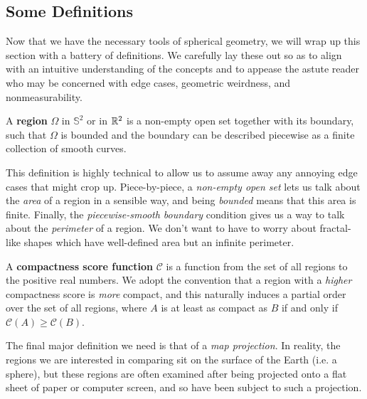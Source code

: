 \subsection{Some Definitions}

Now that we have the necessary tools of spherical geometry, we will wrap up this section with a battery of definitions. 
We carefully lay these out so
as to align with an intuitive understanding of the concepts and to
appease the astute reader who may be concerned with edge cases,
geometric weirdness, and nonmeasurability. 









\begin{definition}
	A \textbf{region} $\Omega$ in $\mathbb{S}^2$ or 
	in $\mathbb{R}^2$ is a non-empty open set together with its
	boundary, such that $\Omega$ is bounded and the boundary can be described piecewise as 
	a finite collection of smooth curves.
\end{definition}

This definition is highly technical to allow us to assume away any annoying edge 
cases that might crop up.  Piece-by-piece, a \textit{non-empty open set} lets us 
talk about the \textit{area} of a region in a sensible way, and being \textit{bounded} means that this area is finite.  Finally, the 
\textit{piecewise-smooth boundary} condition gives us a way to talk about the \textit{perimeter} 
of a region.  We don't want to have to worry about fractal-like shapes which have well-defined 
area but an infinite perimeter.










\begin{definition}
  A \textbf{compactness score function} $\mathcal{C}$ is a function from
  the set of all regions to the positive real numbers.  We adopt the
  convention that a region with a \textit{higher} compactness score is
  \textit{more} compact, and this naturally induces a partial order over
  the set of all regions, where $A$ is at least as compact as $B$ if and
  only if $\mathcal{C}(A)\geq \mathcal{C}(B)$.
\end{definition}

The final major definition we need is that of a \textit{map
projection}.  In reality, the regions we are interested in comparing
sit on the surface of the Earth (i.e. a sphere), but these regions are
often examined after being projected onto a flat sheet of paper or
computer screen, and so have been subject to such a projection.

